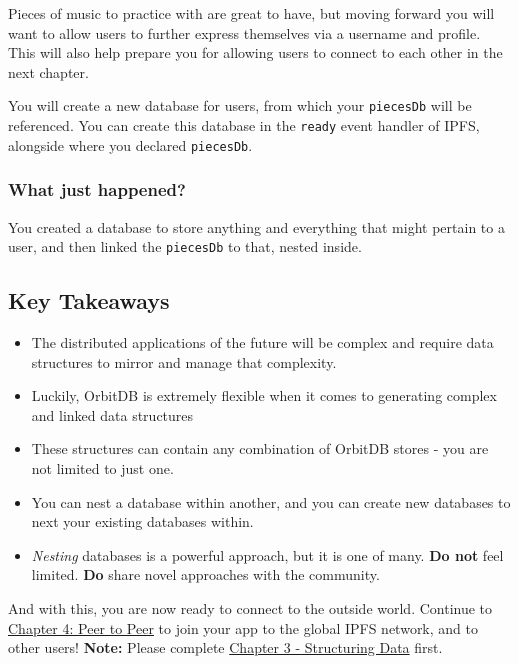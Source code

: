 Pieces of music to practice with are great to have, but moving forward
you will want to allow users to further express themselves via a
username and profile. This will also help prepare you for allowing users
to connect to each other in the next chapter.

You will create a new database for users, from which your
\texttt{piecesDb} will be referenced. You can create this database in
the \texttt{ready} event handler of IPFS, alongside where you declared
\texttt{piecesDb}.

\begin{Shaded}
\begin{Highlighting}[]

\end{Highlighting}
\end{Shaded}

\subsubsection{What just happened?}\label{what-just-happened-12}

You created a database to store anything and everything that might
pertain to a user, and then linked the \texttt{piecesDb} to that, nested
inside.

\subsection{Key Takeaways}\label{key-takeaways-2}

\begin{itemize}
\tightlist
\item
  The distributed applications of the future will be complex and require
  data structures to mirror and manage that complexity.
\item
  Luckily, OrbitDB is extremely flexible when it comes to generating
  complex and linked data structures
\item
  These structures can contain any combination of OrbitDB stores - you
  are not limited to just one.
\item
  You can nest a database within another, and you can create new
  databases to next your existing databases within.
\item
  \emph{Nesting} databases is a powerful approach, but it is one of
  many. \textbf{Do not} feel limited. \textbf{Do} share novel approaches
  with the community.
\end{itemize}

And with this, you are now ready to connect to the outside world.
Continue to \href{04_P2P.md}{Chapter 4: Peer to Peer} to join your app
to the global IPFS network, and to other users! \textbf{Note:} Please
complete \href{./03_Structuring_Data.md}{Chapter 3 - Structuring Data}
first.


